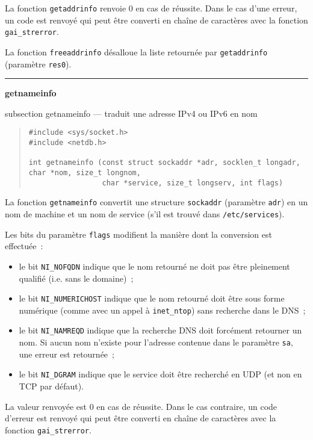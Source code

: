 \documentclass [twoside] {report}
\newcommand {\primitive} [1]
    {
	\phantomsection
	{\large \bf #1}
	\addcontentsline {toc} {subsection} {#1}
    }
\newcommand {\separation}
    {
	\vspace {5mm}
	\nopagebreak
	\hrule
    }
\begin{document}
La fonction \texttt {getaddrinfo} renvoie 0 en cas de réussite.
Dans le cas d'une erreur, un code est renvoyé qui peut être converti
en chaîne de caractères avec la fonction \texttt {gai\_strerror}.

La fonction {\tt freeaddrinfo} désalloue la liste retournée par
\texttt {getaddrinfo} (paramètre \texttt {res0}).


\separation
\primitive {getnameinfo} --- traduit une adresse IPv4 ou IPv6 en nom

\begin {quote}
\begin {verbatim}
#include <sys/socket.h>
#include <netdb.h>

int getnameinfo (const struct sockaddr *adr, socklen_t longadr, char *nom, size_t longnom,
                 char *service, size_t longserv, int flags)
\end{verbatim}
\end {quote}

La fonction \texttt {getnameinfo} convertit une structure \texttt
{sockaddr} (paramètre \texttt {adr}) en un nom de machine et un nom
de service (s'il est trouvé dans \texttt {/etc/services}).

Les bits du paramètre \texttt {flags} modifient la manière dont la
conversion est effectuée~:

\begin {itemize}
    \item le bit \texttt {NI\_NOFQDN} indique que le nom retourné
	ne doit pas être pleinement qualifié (i.e. sans le domaine)~;

    \item le bit \texttt {NI\_NUMERICHOST} indique que le nom
	retourné doit être sous forme numérique (comme avec un appel
	à \texttt {inet\_ntop}) sans recherche dans le DNS~;

    \item le bit \texttt {NI\_NAMREQD} indique que la recherche
	DNS doit forcément retourner un nom. Si aucun nom n'existe
	pour l'adresse contenue dans le paramètre \texttt {sa}, une
	erreur est retournée~;

    \item le bit \texttt {NI\_DGRAM} indique que le service doit
	être recherché en UDP (et non en TCP par défaut).

\end {itemize}

La valeur renvoyée est 0 en cas de réussite. Dans le cas contraire,
un code d'erreur est renvoyé qui peut être converti en chaîne de
caractères avec la fonction \texttt {gai\_strerror}.
\end{document}
